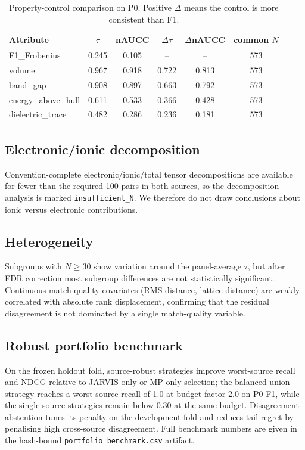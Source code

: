 \documentclass[11pt]{article}
\begin{document}
\begin{table}[htbp]
\centering
\caption{Property-control comparison on P0. Positive $\Delta$ means the control is more consistent than F1.}
\label{tab:controls}
\begin{tabular}{lccccc}
\toprule
Attribute & $\tau$ & nAUCC & $\Delta\tau$ & $\Delta$nAUCC & common $N$ \\
\midrule
F1\_Frobenius & 0.245 & 0.105 & -- & -- & 573 \\
volume & 0.967 & 0.918 & 0.722 & 0.813 & 573 \\
band\_gap & 0.908 & 0.897 & 0.663 & 0.792 & 573 \\
energy\_above\_hull & 0.611 & 0.533 & 0.366 & 0.428 & 573 \\
dielectric\_trace & 0.482 & 0.286 & 0.236 & 0.181 & 573 \\
\bottomrule
\end{tabular}
\end{table}

\subsection{Electronic/ionic decomposition}
Convention-complete electronic/ionic/total tensor decompositions are available for fewer than the required 100 pairs in both sources, so the decomposition analysis is marked \texttt{insufficient\_N}.
We therefore do not draw conclusions about ionic versus electronic contributions.

\subsection{Heterogeneity}
Subgroups with $N\ge 30$ show variation around the panel-average $\tau$, but after FDR correction most subgroup differences are not statistically significant.
Continuous match-quality covariates (RMS distance, lattice distance) are weakly correlated with absolute rank displacement, confirming that the residual disagreement is not dominated by a single match-quality variable.

\subsection{Robust portfolio benchmark}
On the frozen holdout fold, source-robust strategies improve worst-source recall and NDCG relative to JARVIS-only or MP-only selection; the balanced-union strategy reaches a worst-source recall of 1.0 at budget factor 2.0 on P0 F1, while the single-source strategies remain below 0.30 at the same budget.
Disagreement abstention tunes its penalty on the development fold and reduces tail regret by penalising high cross-source disagreement.
Full benchmark numbers are given in the hash-bound \texttt{portfolio\_benchmark.csv} artifact.
\end{document}
